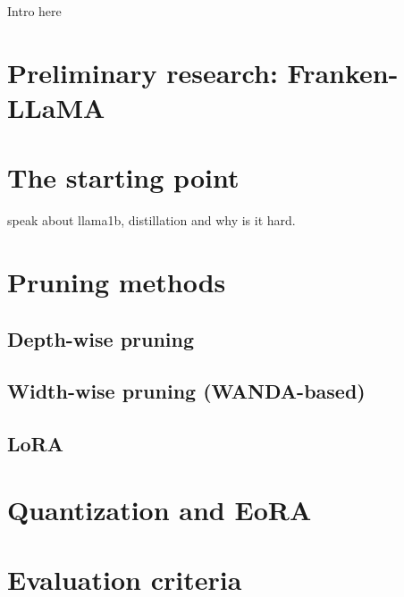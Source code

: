 Intro here

\section{Preliminary research: Franken-LLaMA}
\section{The starting point}
speak about llama1b, distillation and why is it hard.
\section{Pruning methods}
\subsection{Depth-wise pruning}
\subsection{Width-wise pruning (WANDA-based)}
\subsection{LoRA}
\section{Quantization and EoRA}
\section{Evaluation criteria}